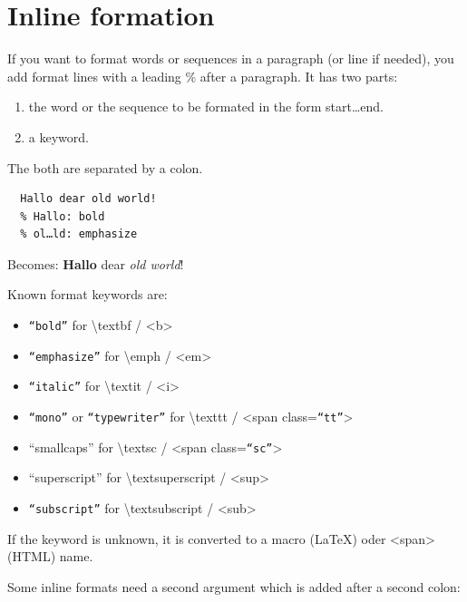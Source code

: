 \documentclass{article}
\begin{document}
\section{Inline formation}

{If you want to format words or sequences in a paragraph (or
line if needed), you add format lines with a leading \% after
a paragraph. It has two parts:\\}

\begin{enumerate}
\item the word or the sequence to be formated in the form
  start…end. 
\item a keyword.
\end{enumerate}


{The both are separated by a colon.\\}

\begin{verbatim}
  Hallo dear old world!
  % Hallo: bold
  % ol…ld: emphasize
\end{verbatim}


{Becomes:
\textbf{Hallo} dear \emph{old world}!\\}

{Known format keywords are:\\}

\begin{itemize}
\item \texttt{“bold”} for \textbackslash textbf / <b>
\item \texttt{“emphasize”} for \textbackslash emph / <em>
\item \texttt{“italic”} for \textbackslash textit / <i>
\item \texttt{“mono”} or \texttt{“typewriter”} for \textbackslash texttt / <span class=\texttt{“tt”}>
\item “smallcaps” for \textbackslash textsc / <span class=\texttt{“sc”}>
\item “superscript” for \textbackslash textsuperscript / <sup>
\item \texttt{“subscript”} for \textbackslash textsubscript / <sub>
\end{itemize}


{If the keyword is unknown, it is converted to a macro
(LaTeX) oder <span> (HTML) name.\\}

{Some inline formats need a second argument which is added
after a second colon:\\}
\end{document}
